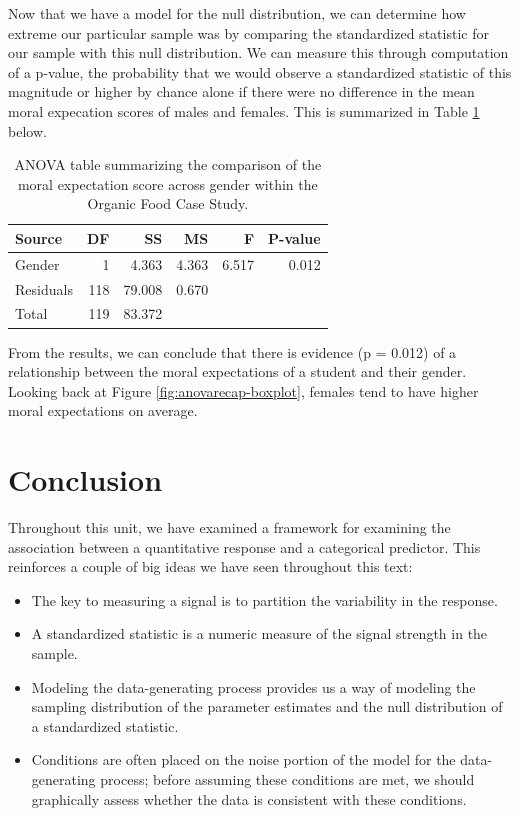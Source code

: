 \documentclass[
]{book}
\providecommand{\tightlist}{%
  \setlength{\itemsep}{0pt}\setlength{\parskip}{0pt}}
\theoremstyle{plain}
\theoremstyle{mydefn}
\theoremstyle{myexmpl}
\theoremstyle{remark}
\begin{document}
Now that we have a model for the null distribution, we can determine how extreme our particular sample was by comparing the standardized statistic for our sample with this null distribution. We can measure this through computation of a p-value, the probability that we would observe a standardized statistic of this magnitude or higher by chance alone if there were no difference in the mean moral expecation scores of males and females. This is summarized in Table \ref{tab:anovarecap-anova-table} below.

\begin{table}

\caption{\label{tab:anovarecap-anova-table}ANOVA table summarizing the comparison of the moral expectation score across gender within the Organic Food Case Study.}
\centering
\begin{tabular}[t]{l|r|r|r|r|r}
\hline
Source & DF & SS & MS & F & P-value\\
\hline
Gender & 1 & 4.363 & 4.363 & 6.517 & 0.012\\
\hline
Residuals & 118 & 79.008 & 0.670 &  & \\
\hline
Total & 119 & 83.372 &  &  & \\
\hline
\end{tabular}
\end{table}

From the results, we can conclude that there is evidence (p = 0.012) of a relationship between the moral expectations of a student and their gender. Looking back at Figure \ref{fig:anovarecap-boxplot}, females tend to have higher moral expectations on average.

\hypertarget{conclusion}{%
\section{Conclusion}\label{conclusion}}

Throughout this unit, we have examined a framework for examining the association between a quantitative response and a categorical predictor. This reinforces a couple of big ideas we have seen throughout this text:

\begin{itemize}
\tightlist
\item
  The key to measuring a signal is to partition the variability in the response.
\item
  A standardized statistic is a numeric measure of the signal strength in the sample.
\item
  Modeling the data-generating process provides us a way of modeling the sampling distribution of the parameter estimates and the null distribution of a standardized statistic.
\item
  Conditions are often placed on the noise portion of the model for the data-generating process; before assuming these conditions are met, we should graphically assess whether the data is consistent with these conditions.
\end{itemize}
\end{document}
